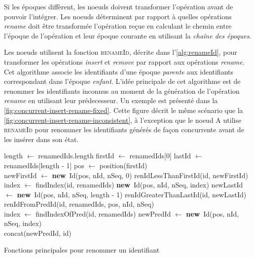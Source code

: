 \documentclass[12pt]{thesul}
\newcommand{\new}{\textbf{new}}
\begin{document}
Si les époques diffèrent, les noeuds doivent transformer l'opération avant de pouvoir l'intégrer.
Les noeuds déterminent par rapport à quelles opérations \emph{rename} doit être transformée l'opération reçue en calculant le chemin entre l'époque de l'opération et leur époque courante en utilisant la \emph{chaîne des époques}.

Les noeuds utilisent la fonction \textsc{renameId}, décrite dans l'\autoref{alg:renameId}, pour transformer les opérations \emph{insert} et \emph{remove} par rapport aux opérations \emph{rename}.
Cet algorithme associe les identifiants d'une époque \emph{parente} aux identifiants correspondant dans l'époque \emph{enfant}.
L'idée principale de cet algorithme est de renommer les identifiants inconnus au moment de la génération de l'opération \emph{rename} en utilisant leur prédecesseur.
Un exemple est présenté dans la \autoref{fig:concurrent-insert-rename-fixed}.
Cette figure décrit le même scénario que la \autoref{fig:concurrent-insert-rename-inconsistent}, à l'exception que le noeud A utilise \textsc{renameId} pour renommer les identifiants générés de façon concurrente avant de les insérer dans son état.

\begin{algorithm}[!ht]
  \footnotesize
  \begin{algorithmic}
          \State length $\gets$ renamedIds.length
          \State firstId $\gets$ renamedIds[0]
          \State lastId $\gets$ renamedIds[length - 1]
          \State pos $\gets$ position(firstId)
          \\
              \State newFirstId $\gets$ \new~Id(pos, nId, nSeq, 0)
              \State \Return renIdLessThanFirstId(id, newFirstId)
              \State index $\gets$ findIndex(id, renamedIds)
              \State \Return \new~Id(pos, nId, nSeq, index)
              \State newLastId $\gets$ \new~Id(pos, nId, nSeq, length - 1)
              \State \Return renIdGreaterThanLastId(id, newLastId)
          \Else
              \State \Return renIdFromPredId(id, renamedIds, pos, nId, nSeq)
          \EndIf
      \EndFunction
      \\
          \State index $\gets$ findIndexOfPred(id, renamedIds)
          \State newPredId $\gets$ \new~Id(pos, nId, nSeq, index)
          \\
          \State \Return concat(newPredId, id)
      \EndFunction
  \end{algorithmic}
  \caption{Fonctions principales pour renommer un identifiant}
  \label{alg:renameId}
\end{algorithm}
\end{document}
